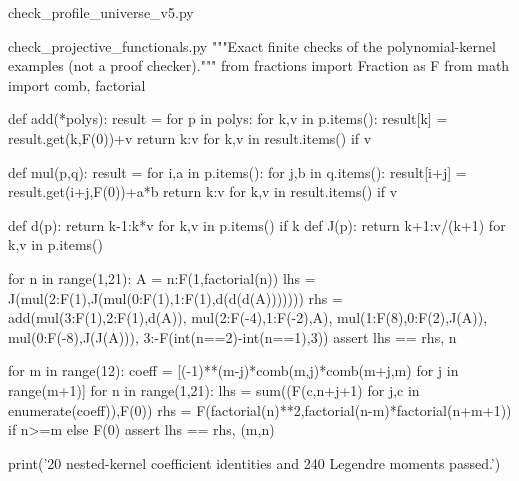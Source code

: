 \begin{filecontents*}[overwrite]{check_profile_universe_v5.py}
\end{filecontents*}
\begin{filecontents*}[overwrite]{check_projective_functionals.py}
"""Exact finite checks of the polynomial-kernel examples (not a proof checker)."""
from fractions import Fraction as F
from math import comb, factorial

def add(*polys):
    result = {}
    for p in polys:
        for k,v in p.items(): result[k] = result.get(k,F(0))+v
    return {k:v for k,v in result.items() if v}

def mul(p,q):
    result = {}
    for i,a in p.items():
        for j,b in q.items(): result[i+j] = result.get(i+j,F(0))+a*b
    return {k:v for k,v in result.items() if v}

def d(p): return {k-1:k*v for k,v in p.items() if k}
def J(p): return {k+1:v/(k+1) for k,v in p.items()}

for n in range(1,21):
    A = {n:F(1,factorial(n))}
    lhs = J(mul({2:F(1)},J(mul({0:F(1),1:F(1)},d(d(d(A)))))))
    rhs = add(mul({3:F(1),2:F(1)},d(A)),
              mul({2:F(-4),1:F(-2)},A),
              mul({1:F(8),0:F(2)},J(A)),
              mul({0:F(-8)},J(J(A))),
              {3:-F(int(n==2)-int(n==1),3)})
    assert lhs == rhs, n

for m in range(12):
    coeff = [(-1)**(m-j)*comb(m,j)*comb(m+j,m) for j in range(m+1)]
    for n in range(1,21):
        lhs = sum((F(c,n+j+1) for j,c in enumerate(coeff)),F(0))
        rhs = F(factorial(n)**2,factorial(n-m)*factorial(n+m+1)) if n>=m else F(0)
        assert lhs == rhs, (m,n)

print('20 nested-kernel coefficient identities and 240 Legendre moments passed.')

\end{filecontents*}
